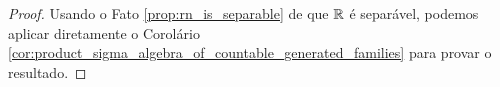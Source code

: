 \begin{proof}
    Usando o Fato \ref{prop:rn_is_separable} de que $\mathbb{R}$ é separável, podemos aplicar diretamente o Corolário \ref{cor:product_sigma_algebra_of_countable_generated_families} para provar o resultado.
\end{proof}